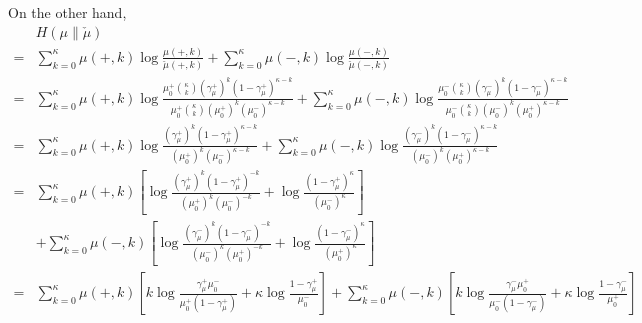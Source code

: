 \documentclass[12pt]{article}
\numberwithin{equation}{section}
\begin{document}
On the other hand,
\begin{align*}
      & H(\mu \| \check{\mu})                                                                                   \\
    = & \sum_{k=0}^\kappa \mu(+, k)\log\frac{\mu(+, k)}{\check{\mu}(+, k)}
    + \sum_{k=0}^\kappa \mu(-, k)\log\frac{\mu(-, k)}{\check{\mu}(-, k)}                                        \\
    = & \sum_{k=0}^\kappa \mu(+, k)\log\frac{
    \mu_0^+{\kappa \choose k}\left(\gamma_\mu^+\right)^k\left(1 - \gamma_\mu^+\right)^{\kappa - k}
    }{
    \mu_0^+{\kappa \choose k}\left(\mu_0^+\right)^k\left(\mu_0^-\right)^{\kappa - k}}
    + \sum_{k=0}^\kappa \mu(-, k)\log\frac{
    \mu_0^-{\kappa \choose k}\left(\gamma_\mu^-\right)^k\left(1 - \gamma_\mu^-\right)^{\kappa - k}
    }{
    \mu_0^-{\kappa \choose k}\left(\mu_0^-\right)^k\left(\mu_0^+\right)^{\kappa - k}}                           \\
    = & \sum_{k=0}^\kappa \mu(+, k)\log\frac{
        \left(\gamma_\mu^+\right)^k\left(1 - \gamma_\mu^+\right)^{\kappa - k}
    }{
        \left(\mu_0^+\right)^k\left(\mu_0^-\right)^{\kappa - k}}
    + \sum_{k=0}^\kappa \mu(-, k)\log\frac{
        \left(\gamma_\mu^-\right)^k\left(1 - \gamma_\mu^-\right)^{\kappa - k}
    }{
    \left(\mu_0^-\right)^k\left(\mu_0^+\right)^{\kappa - k}}                                                    \\
    = & \sum_{k=0}^\kappa \mu(+, k)\left[\log\frac{
            \left(\gamma_\mu^+\right)^k\left(1 - \gamma_\mu^+\right)^{-k}
        }{
            \left(\mu_0^+\right)^k\left(\mu_0^-\right)^{-k}}
    + \log \frac{\left(1 - \gamma_\mu^+\right)^\kappa}{\left(\mu_0^-\right)^\kappa}\right]                      \\
      & + \sum_{k=0}^\kappa \mu(-, k)\left[\log\frac{
            \left(\gamma_\mu^-\right)^k\left(1 - \gamma_\mu^-\right)^{-k}
        }{
            \left(\mu_0^-\right)^k\left(\mu_0^+\right)^{-k}}
    + \log\frac{\left(1 - \gamma_\mu^-\right)^\kappa}{\left(\mu_0^+\right)^\kappa}\right]                       \\
    = & \sum_{k=0}^\kappa \mu(+, k)\left[k\log\frac{\gamma_\mu^+ \mu_0^-}{\mu_0^+\left(1 - \gamma_\mu^+\right)}
        + \kappa\log\frac{1 - \gamma_\mu^+}{\mu_0^-}\right]
    + \sum_{k=0}^\kappa \mu(-, k)\left[k\log\frac{\gamma_\mu^- \mu_0^+}{\mu_0^-\left(1 - \gamma_\mu^-\right)}
    + \kappa\log\frac{1 - \gamma_\mu^-}{\mu_0^+}\right]                                                         \\

\end{align*}
\end{document}
